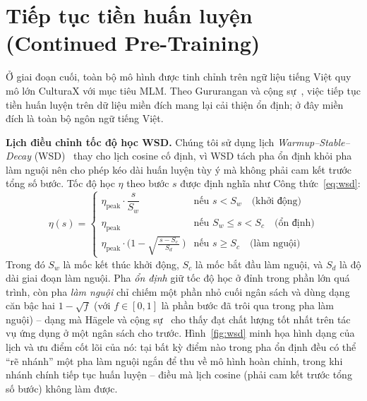 \section{Tiếp tục tiền huấn luyện (Continued Pre-Training)}
\label{sec:cpt}

Ở giai đoạn cuối, toàn bộ mô hình được tinh chỉnh trên ngữ liệu tiếng Việt quy mô lớn
CulturaX với mục tiêu MLM. Theo Gururangan và cộng sự~\cite{gururangan2020dapt}, việc tiếp
tục tiền huấn luyện trên dữ liệu miền đích mang lại cải thiện ổn định; ở đây miền đích là
toàn bộ ngôn ngữ tiếng Việt.

\textbf{Lịch điều chỉnh tốc độ học WSD.} Chúng tôi sử dụng lịch \textit{Warmup--Stable--Decay}
(WSD)~\cite{hu2024minicpm} thay cho lịch cosine cố định, vì WSD tách pha ổn định khỏi pha
làm nguội nên cho phép kéo dài huấn luyện tùy ý mà không phải cam kết trước tổng số bước.
Tốc độ học $\eta$ theo bước $s$ được định nghĩa như Công thức~\eqref{eq:wsd}:
\begin{equation}
  \label{eq:wsd}
  \eta(s) =
  \begin{cases}
    \eta_{\mathrm{peak}} \cdot \dfrac{s}{S_w} & \text{nếu } s < S_w \quad \text{(khởi động)}\\[2mm]
    \eta_{\mathrm{peak}} & \text{nếu } S_w \le s < S_c \quad \text{(ổn định)}\\[2mm]
    \eta_{\mathrm{peak}} \cdot \Big(1 - \sqrt{\tfrac{\,s - S_c\,}{S_d}}\,\Big) & \text{nếu } s \ge S_c \quad \text{(làm nguội)}
  \end{cases}
\end{equation}
Trong đó $S_w$ là mốc kết thúc khởi động, $S_c$ là mốc bắt đầu làm nguội, và $S_d$ là độ dài
giai đoạn làm nguội. Pha \textit{ổn định} giữ tốc độ học ở đỉnh trong phần lớn quá trình,
còn pha \textit{làm nguội} chỉ chiếm một phần nhỏ cuối ngân sách và dùng dạng căn bậc hai
$1-\sqrt{f}$ (với $f\in[0,1]$ là phần bước đã trôi qua trong pha làm nguội) -- dạng mà Hägele
và cộng sự~\cite{hagele2024scaling} cho thấy đạt chất lượng tốt nhất trên tác vụ ứng dụng ở một ngân
sách cho trước. Hình~\ref{fig:wsd} minh họa hình dạng của
lịch và ưu điểm cốt lõi của nó: tại bất kỳ điểm nào trong pha ổn định đều có thể ``rẽ
nhánh'' một pha làm nguội ngắn để thu về mô hình hoàn chỉnh, trong khi nhánh chính tiếp tục
huấn luyện -- điều mà lịch cosine (phải cam kết trước tổng số bước) không làm được.


